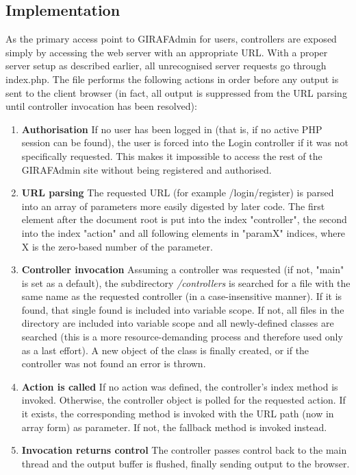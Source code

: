 \subsection{Implementation}
As the primary access point to GIRAFAdmin for users, controllers are exposed simply by accessing the web server with an appropriate URL. With a proper server setup as described earlier, all unrecognised server requests go through index.php. The file performs the following actions in order before any output is sent to the client browser (in fact, all output is suppressed from the URL parsing until controller invocation has been resolved):
\begin{enumerate}
    \item \textbf{Authorisation} If no user has been logged in (that is, if no active PHP session can be found), the user is forced into the Login controller if it was not specifically requested. This makes it impossible to access the rest of the GIRAFAdmin site without being registered and authorised.
    \item \textbf{URL parsing} The requested URL (for example /login/register) is parsed into an array of parameters more easily digested by later code. The first element after the document root is put into the index "controller", the second into the index "action" and all following elements in "paramX" indices, where X is the zero-based number of the parameter.
    \item \textbf{Controller invocation} Assuming a controller was requested (if not, "main" is set as a default), the subdirectory \emph{/controllers} is searched for a file with the same name as the requested controller (in a case-insensitive manner). If it is found, that single found is included into variable scope. If not, all files in the directory are included into variable scope and all newly-defined classes are searched (this is a more resource-demanding process and therefore used only as a last effort). A new object of the class is finally created, or if the controller was not found an error is thrown.
    \item \textbf{Action is called} If no action was defined, the controller's index method is invoked. Otherwise, the controller object is polled for the requested action. If it exists, the corresponding method is invoked with the URL path (now in array form) as parameter. If not, the fallback method is invoked instead.
    \item \textbf{Invocation returns control} The controller passes control back to the main thread and the output buffer is flushed, finally sending output to the browser.
\end{enumerate}

